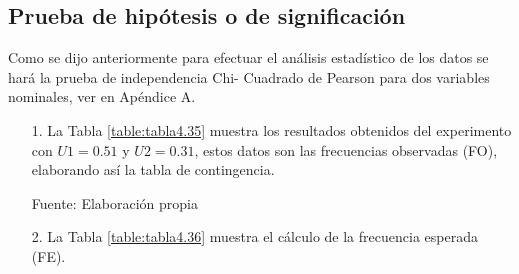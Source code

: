 \subsection{Prueba de hipótesis o de significación}
Como se dijo anteriormente para efectuar el análisis estadístico de los datos se hará la prueba de independencia Chi- Cuadrado de Pearson para dos variables nominales, ver en Apéndice A.

\begin{enumerate}
\item[1.] La Tabla \ref{table:tabla4.35} muestra los resultados obtenidos del experimento con $U1 = 0.51$ y $U2 = 0.31$, estos datos son las frecuencias observadas (FO), elaborando así la tabla de contingencia.

\begin{center}
\begin{table}[H]
\centering
\caption{\small{Tabla de contingencia o de frecuencias observadas.}}
\label{table:tabla4.35}
\vskip 0.2cm
\begin{center}
\vskip 0.2cm
{\small{Fuente: Elaboración propia}}
\end{center}
\end{table}
\end{center}

\item[2.] La Tabla \ref{table:tabla4.36} muestra el cálculo de la frecuencia esperada (FE).


\end{enumerate}
